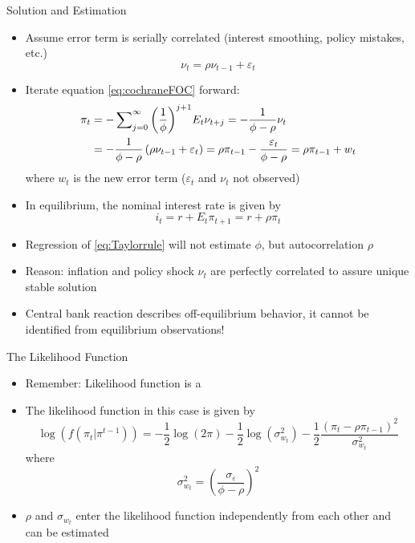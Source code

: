 \begin{frame}{Solution and Estimation}
\begin{itemize}
\item Assume error term is serially correlated (interest smoothing, policy mistakes, etc.) \vspace{-.2cm}
\begin{equation}
{\nu _t} = \rho {\nu _{t - 1}} + {\varepsilon _t}
\end{equation}
\item Iterate equation \eqref{eq:cochraneFOC} forward:
\begin{align}
  {\pi _t} &=  - \sum\nolimits_{j = 0}^\infty  {{{\left( {\frac{1}{\phi }} \right)}^{j + 1}}{E_t}{\nu _{t + j}}}  =  - \frac{1}{{\phi  - \rho }}{\nu _t} \notag \\
   &=  - \frac{1}{{\phi  - \rho }}\left( {\rho {\nu _{t - 1}} + {\varepsilon _t}} \right) = \rho {\pi _{t - 1}} - \frac{{{\varepsilon _t}}}{{\phi  - \rho }} = \rho {\pi _{t - 1}} + {w_t}
\end{align}
where $w_t$ is the new error term ($\varepsilon _t$ and $\nu_t$ not observed)
\item In equilibrium, the nominal interest rate is given by \vspace{-.2cm}
\begin{equation}
{i_t} = r + {E_t}{\pi _{t + 1}} = r + \rho {\pi _t}
\end{equation}
\item Regression of \eqref{eq:Taylorrule} will not estimate $\phi$, but autocorrelation $\rho$
\item Reason: inflation and policy shock $\nu_t$ are perfectly correlated to assure unique stable solution
\item Central bank reaction describes off-equilibrium behavior, it cannot be identified from equilibrium observations!
\end{itemize}
\end{frame}

\renewcommand{\Source}{}
\begin{frame}{The Likelihood Function}
\begin{itemize}
\item Remember: Likelihood function is a 
\item The likelihood function in this case is given by
  \begin{equation}
 \log \left( {f\left( {{\pi _t}|{\pi ^{t - 1}}} \right)} \right) =  - \frac{1}{2}\log \left( {2\pi } \right) - \frac{1}{2}\log \left( {\sigma _{{w_t}}^2} \right) - \frac{1}{2}\frac{{{{\left( {{\pi _t} - \rho {\pi _{t - 1}}} \right)}^2}}}{{\sigma _{{w_t}}^2}}
  \end{equation}
  where
  \begin{equation}
  \sigma _{{w_t}}^2 = {\left( {\frac{{{\sigma _\varepsilon }}}{{\phi  - \rho }}} \right)^2}
  \end{equation}
\item $\rho$ and $\sigma _{{w_t}}$ enter the likelihood function independently from each other and can be estimated
\end{itemize}
\end{frame}

